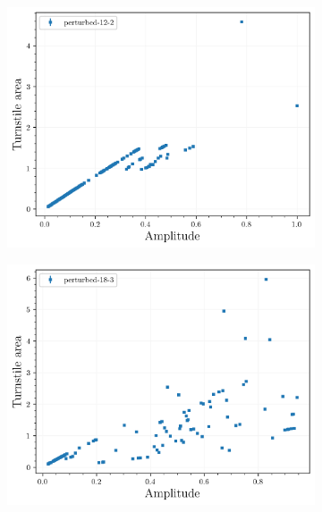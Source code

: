 \begin{figure}[H]
    \centering
    \begin{subfigure}{0.49\textwidth}
        \centering
        \includegraphics[width=\textwidth]{images/amplitudescan/turnstile_area_12_2.png}
        \caption{}
        \label{fig:scan-12-2}
    \end{subfigure}
    \begin{subfigure}{0.49\textwidth}
        \centering
        \includegraphics[width=\textwidth]{images/amplitudescan/turnstile_area_18_3.png}
        \caption{}
        \label{fig:scan-18-3}
    \end{subfigure}
    \caption{}
    \label{fig:amp-scan}
\end{figure}


